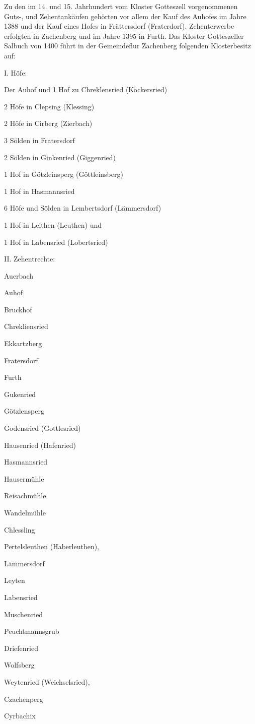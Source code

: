 \documentclass[12pt,a4pager]{book}
\begin{document}
Zu den im 14. und 15. Jahrhundert vom Kloster Gotteszell vorgenommenen Guts-,
und Zehentankäufen gehörten vor allem der Kauf des Auhofes im Jahre 1388 und der
Kauf eines Hofes in Frättersdorf (Fraterdorf). Zehenterwerbe erfolgten in
Zachenberg und im Jahre 1395 in Furth. Das Kloster Gotteszeller Salbuch von 1400
führt in der Gemeindeflur Zachenberg folgenden Klosterbesitz auf:

I. Höfe:

\begin{compactitem}
\item Der Auhof und 1 Hof zu Chreklensried (Köckersried)
\item 2 Höfe in Clepsing (Klessing)
\item 2 Höfe in Cirberg (Zierbach)
\item 3 Sölden in Fratersdorf
\item 2 Sölden in Ginkenried (Giggenried)
\item 1 Hof in Götzleinsperg (Göttleinsberg)
\item 1 Hof in Hasmannsried
\item 6 Höfe und Sölden in Lembertsdorf (Lämmersdorf)
\item 1 Hof in Leithen (Leuthen) und
\item 1 Hof in Labensried (Lobertsried)
\end{compactitem}

II. Zehentrechte:

\begin{compactitem}
\item Auerbach
\item Auhof
\item Bruckhof
\item Chrekliensried
\item Ekkartzberg
\item Fratersdorf
\item Furth
\item Gukenried
\item Götzlensperg
\item Godensried (Gottlesried)
\item Hausenried (Hafenried)
\item Hasmannsried
\item Hausermühle
\item Reisachmühle
\item Wandelmühle
\item Chlessling
\item Pertelsleuthen (Haberleuthen),
\item Lämmersdorf
\item Leyten
\item Labensried
\item Muschenried
\item Peuchtmannsgrub
\item Driefenried
\item Wolfsberg
\item Weytenried (Weichselsried),
\item Czachenperg
\item Cyrbachix
\end{compactitem}
\end{document}
